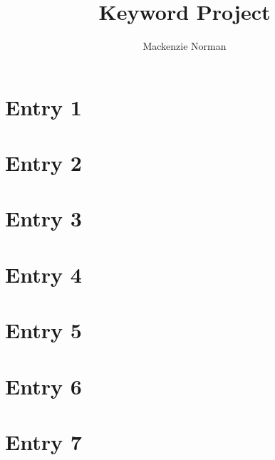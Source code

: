 \documentclass{article}
\title{
Keyword Project
}
\author{Mackenzie Norman}
\date{}
\begin{document}
\maketitle


\chapter{Entry 1}


\chapter{Entry 2}


\chapter{Entry 3}


\chapter{Entry 4}

\chapter{Entry 5}


\chapter{Entry 6}

\chapter{Entry 7}

\end{document}
